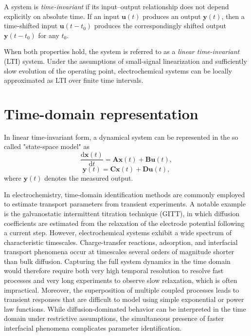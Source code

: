 A system is \emph{time-invariant} if its input--output relationship does not depend explicitly on absolute time.
If an input $\mathbf{u}(t)$ produces an output $\mathbf{y}(t)$, then a time-shifted input $\mathbf{u}(t - t_0)$ produces the correspondingly shifted output $\mathbf{y}(t - t_0)$ for any $t_0$.

When both properties hold, the system is referred to as a \emph{linear time-invariant} (LTI) system.
Under the assumptions of small-signal linearization and sufficiently slow evolution of the operating point, electrochemical systems can be locally approximated as LTI over finite time intervals.

\section{Time-domain representation}

In linear time-invariant form, a dynamical system can be represented in the so called "state-space model" as
\begin{equation}
    \frac{\mathrm{d}\mathbf{x}(t)}{\mathrm{d}t} = \mathbf{A}\mathbf{x}(t) + \mathbf{B}\mathbf{u}(t),
    \label{eq:state space input}
\end{equation}
\begin{equation}
    \mathbf{y}(t) = \mathbf{C}\mathbf{x}(t) + \mathbf{D}\mathbf{u}(t),
    \label{eq:state space output}
\end{equation}
where $\mathbf{y}(t)$ denotes the measured output.

In electrochemistry, time-domain identification methods are commonly employed to estimate transport parameters from transient experiments.
A notable example is the galvanostatic intermittent titration technique (GITT), in which diffusion coefficients are estimated from the relaxation of the electrode potential following a current step.
However, electrochemical systems exhibit a wide spectrum of characteristic timescales.
Charge-transfer reactions, adsorption, and interfacial transport phenomena occur at timescales several orders of magnitude shorter than bulk diffusion.
Capturing the full system dynamics in the time domain would therefore require both very high temporal resolution to resolve fast processes and very long experiments to observe slow relaxation, which is often impractical.
Moreover, the superposition of multiple coupled processes leads to transient responses that are difficult to model using simple exponential or power law functions.
While diffusion-dominated behavior can be interpreted in the time domain under restrictive assumptions, the simultaneous presence of faster interfacial phenomena complicates parameter identification.

